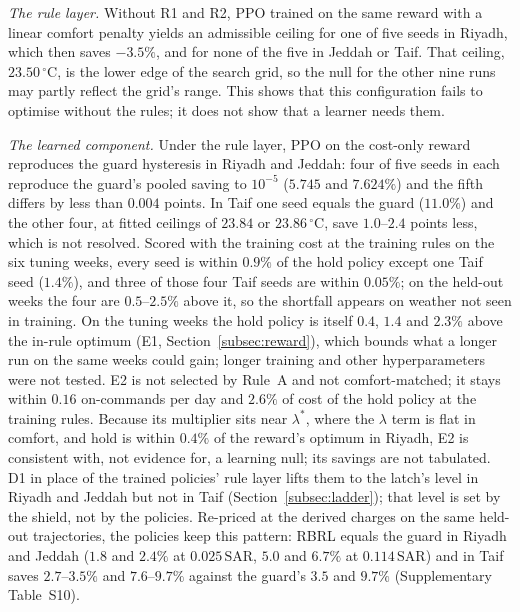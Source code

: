 \documentclass[3p,twocolumn,number]{elsarticle}
\newcommand{\SAR}{\text{SAR}}
\begin{document}
\emph{The rule layer.} Without R1 and R2, PPO trained on the same reward with a linear comfort penalty yields an admissible ceiling for one of five seeds in Riyadh, which then saves $-3.5\%$, and for none of the five in Jeddah or Taif. That ceiling, $23.50\,^\circ$C, is the lower edge of the search grid, so the null for the other nine runs may partly reflect the grid's range. This shows that this configuration fails to optimise without the rules; it does not show that a learner needs them.

\emph{The learned component.} Under the rule layer, PPO on the cost-only reward reproduces the guard hysteresis in Riyadh and Jeddah: four of five seeds in each reproduce the guard's pooled saving to $10^{-5}$ ($5.745$ and $7.624\%$) and the fifth differs by less than $0.004$ points. In Taif one seed equals the guard ($11.0\%$) and the other four, at fitted ceilings of $23.84$ or $23.86\,^\circ$C, save $1.0$--$2.4$ points less, which is not resolved. Scored with the training cost at the training rules on the six tuning weeks, every seed is within $0.9\%$ of the hold policy except one Taif seed ($1.4\%$), and three of those four Taif seeds are within $0.05\%$; on the held-out weeks the four are $0.5$--$2.5\%$ above it, so the shortfall appears on weather not seen in training. On the tuning weeks the hold policy is itself $0.4$, $1.4$ and $2.3\%$ above the in-rule optimum (E1, Section~\ref{subsec:reward}), which bounds what a longer run on the same weeks could gain; longer training and other hyperparameters were not tested. E2 is not selected by Rule~A and not comfort-matched; it stays within $0.16$ on-commands per day and $2.6\%$ of cost of the hold policy at the training rules. Because its multiplier sits near $\lambda^\ast$, where the $\lambda$ term is flat in comfort, and hold is within $0.4\%$ of the reward's optimum in Riyadh, E2 is consistent with, not evidence for, a learning null; its savings are not tabulated. D1 in place of the trained policies' rule layer lifts them to the latch's level in Riyadh and Jeddah but not in Taif (Section~\ref{subsec:ladder}); that level is set by the shield, not by the policies. Re-priced at the derived charges on the same held-out trajectories, the policies keep this pattern: RBRL equals the guard in Riyadh and Jeddah ($1.8$ and $2.4\%$ at $0.025\,\SAR$, $5.0$ and $6.7\%$ at $0.114\,\SAR$) and in Taif saves $2.7$--$3.5\%$ and $7.6$--$9.7\%$ against the guard's $3.5$ and $9.7\%$ (Supplementary Table~S10).
\end{document}
